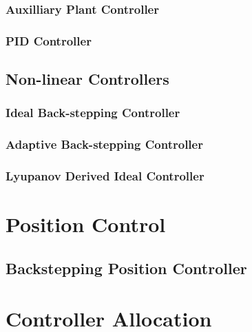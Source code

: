 \subsubsection{Auxilliary Plant Controller}
\subsubsection{PID Controller}
\subsection{Non-linear Controllers}
\label{subsec:control.attitude.nonlinear}
\subsubsection{Ideal Back-stepping Controller}
\subsubsection{Adaptive Back-stepping Controller}
\subsubsection{Lyupanov Derived Ideal Controller}

\section{Position Control}
\label{sec:control.position}
\subsection{Backstepping Position Controller}
\label{subsec:control.position.bacstepping}

\section{Controller Allocation}
\label{sec:control.allocation}
